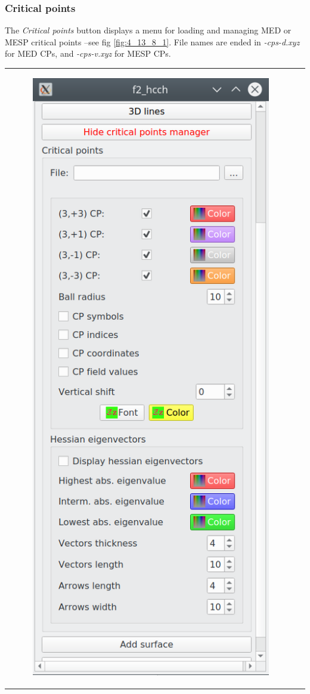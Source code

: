 \documentclass[10pt]{article}
\begin{document}
\subsubsection{Critical points \label{sec:4.13.8}}

The {\it Critical points} button displays a menu for loading and managing MED 
or MESP critical points --see fig \ref{fig:4_13_8_1}.
File names are ended in {\it -cps-d.xyz} for MED CPs, and {\it -cps-v.xyz} for MESP CPs.


\vspace*{5mm}
\hspace*{-5mm}
\begin{tabular}{lr}
\begin{minipage}{.4\linewidth}
    \begin{figure}[H]
        \begin{center}
            \includegraphics[width=0.625\linewidth]{damqt320_CPs_menu.png}

\end{center}
\end{figure}
\end{minipage}
\end{tabular}
\end{document}

